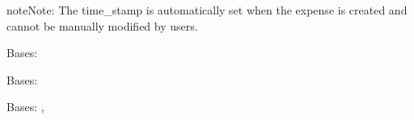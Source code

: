 \documentclass[letterpaper,10pt,english]{sphinxmanual}
\begin{document}
\begin{fulllineitems}
\begin{sphinxadmonition}{note}{Note:}
\sphinxAtStartPar
The time\_stamp is automatically set when the expense is created
and cannot be manually modified by users.
\end{sphinxadmonition}

\begin{fulllineitems}
\label{\detokenize{expensesApp:expensesApp.models.Expense.DoesNotExist}}
\pysigstartsignatures
\pysigline
{}
\pysigstopsignatures
\sphinxAtStartPar
Bases: 

\end{fulllineitems}


\begin{fulllineitems}
\label{\detokenize{expensesApp:expensesApp.models.Expense.MultipleObjectsReturned}}
\pysigstartsignatures
\pysigline
{}
\pysigstopsignatures
\sphinxAtStartPar
Bases: 

\end{fulllineitems}


\begin{fulllineitems}
\label{\detokenize{expensesApp:expensesApp.models.Expense.NotUpdated}}
\pysigstartsignatures
\pysigline
{}
\pysigstopsignatures
\sphinxAtStartPar
Bases: , 

\end{fulllineitems}


\begin{fulllineitems}
\label{\detokenize{expensesApp:expensesApp.models.Expense._meta}}
\pysigstartsignatures
\pysigline
{}
\pysigstopsignatures
\end{fulllineitems}


\end{fulllineitems}
\end{document}
